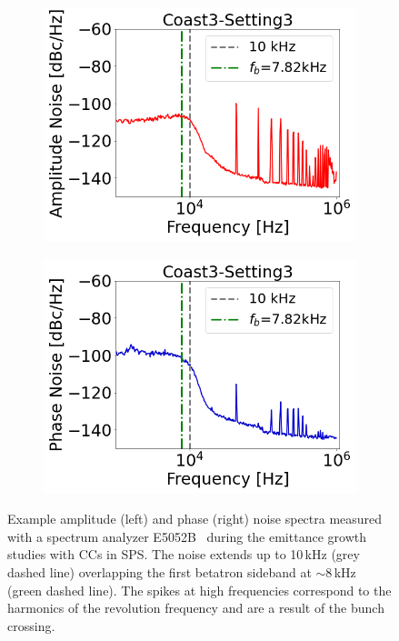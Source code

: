 \begin{figure}[!ht]
    \centering
    \begin{subfigure}[t]{0.45\textwidth}
        \centering
        \includegraphics[width=1\textwidth]{images/Ch6/Measured_spectrum_MD5_Coast3-Setting3-AN.csv_no_psd}
    \end{subfigure}
    \hfill
    \begin{subfigure}[t]{0.45\textwidth}
        \centering
        \includegraphics[width=1\textwidth]{images/Ch6/Measured_spectrum_MD5_Coast3-Setting3-PN.csv_no_psd}
    \end{subfigure}
    \hfill
     \caption{Example amplitude (left) and phase (right) noise spectra measured with a spectrum analyzer E5052B~\cite{E5052B_insight} during the emittance growth studies with CCs in SPS. The noise extends up to 10\,kHz (grey dashed line) overlapping the first betatron sideband at $\sim$8\,kHz (green dashed line). The spikes at high frequencies correspond to the harmonics of the revolution frequency and are a result of the bunch crossing.} %
     \label{fig:example_PN_and_AN_coast3_setting3}
 \end{figure}

